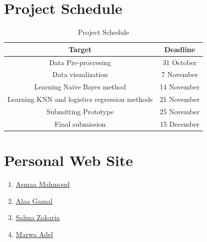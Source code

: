 \documentclass[a4paper, 11pt, oneside]{article} %
\begin{document}
\section{Project Schedule}
\begin{table}[H]
\caption{Project Schedule} %
\centering %
\begin{tabular}{c c } %
\hline\hline %
Target & Deadline \\ [0.5ex] %
\hline %
Data Pre-proccesing & 31 October \\ %
Data visualization & 7 November \\
Learning Naive Bayes method & 14 November  \\
Learning KNN and logistics regression methods   & 21 November \\
Submitting Prototype & 25 November \\
Final submission & 15 December \\ [1ex] %
\hline %
\end{tabular}
\label{table:nonlin} %
\end{table}
\vfil


\section{Personal Web Site}
\begin{enumerate}
\item \href{https://asmaamahmoud12.github.io/Asmaa-Mahmoud/}{Asmaa Mahmoud}
\item \href{https://alaagamal98.github.io/}{Alaa Gamal}
\item \href{https://salmazakariia.github.io/SalmaZakaria/}{Salma Zakaria}
\item \href{https://marwaayosiif.github.io/MarwaYoussif/}{Marwa Adel}
\end{enumerate}
\end{document}
